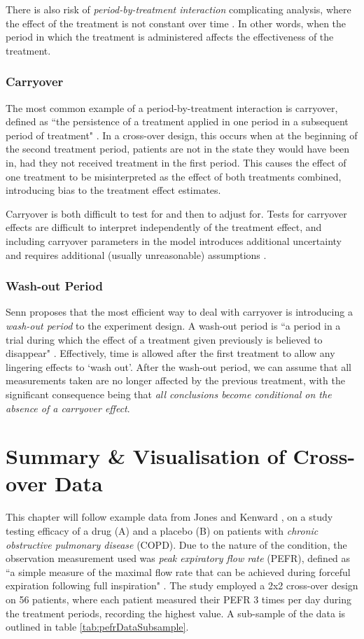 \documentclass[12pt, TexShade, letterpaper]{report}
\begin{document}
There is also risk of \textit{period-by-treatment interaction} complicating analysis, where the effect of the treatment is not constant over time \cite{senn2002crossover}. In other words, when the period in which the treatment is administered affects the effectiveness of the treatment.

\subsection{Carryover}
The most common example of a period-by-treatment interaction is carryover, defined as ``the persistence of a treatment applied in one period in a subsequent period of treatment" \cite{senn2002crossover}. In a cross-over design, this occurs when at the beginning of the second treatment period, patients are not in the state they would have been in, had they not received treatment in the first period. This causes the effect of one treatment to be misinterpreted as the effect of both treatments combined, introducing bias to the treatment effect estimates.

Carryover is both difficult to test for and then to adjust for. Tests for carryover effects are difficult to interpret independently of the treatment effect, and including carryover parameters in the model introduces additional uncertainty and requires additional (usually unreasonable) assumptions \cite{senn2002crossover}.

\subsection{Wash-out Period}
Senn \cite{senn2002crossover} proposes that the most efficient way to deal with carryover is introducing a \textit{wash-out period} to the experiment design. A wash-out period is ``a period in a trial during which the effect of a treatment given previously is believed to disappear" \cite{senn2002crossover}. Effectively, time is allowed after the first treatment to allow any lingering effects to `wash out'. After the wash-out period, we can assume that all measurements taken are no longer affected by the previous treatment, with the significant consequence being that \textit{all conclusions become conditional on the absence of a carryover effect}.

\chapter{Summary \& Visualisation of Cross-over Data} \label{visualisation}
This chapter will follow example data from Jones and Kenward \cite{jones2003design}, on a study testing efficacy of a drug (A) and a placebo (B) on patients with \textit{chronic obstructive pulmonary disease} (COPD). Due to the nature of the condition, the observation measurement used was \textit{peak expiratory flow rate} (PEFR), defined as ``a simple measure of the maximal flow rate that can be achieved during forceful expiration following full inspiration" \cite{peakflowrate2023}. The study employed a 2x2 cross-over design on 56 patients, where each patient measured their PEFR 3 times per day during the treatment periods, recording the highest value. A sub-sample of the data is outlined in table \ref{tab:pefrDataSubsample}.
\end{document}
